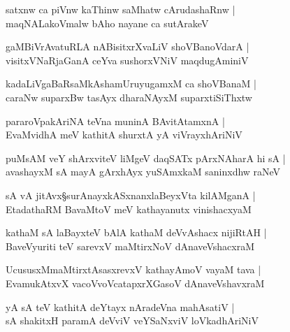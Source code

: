 \begin{shloka}
satxnw ca piVnw kaThinw saMhatw cArudashaRnw |\\
maqNALakoVmalw bAho nayane ca sutArakeV 
\end{shloka}

\begin{shloka}
gaMBiVrAvatuRLA nABisitxrXvaLiV shoVBanoVdarA |\\
visitxVNaRjaGanA ceYva sushorxVNiV maqdugAminiV 
\end{shloka}

\begin{shloka}
kadaLiVgaBaRsaMkAshamUruyugamxM ca shoVBanaM |\\
caraNw suparxBw tasAyx dharaNAyxM suparxtiSiThxtw
\end{shloka}

\begin{shloka}
pararoVpakAriNA teVna muninA BAvitAtamxnA |\\
EvaMvidhA meV kathitA shurxtA yA viVrayxhAriNiV 
\end{shloka}

\begin{shloka}
puMsAM veY shArxviteV liMgeV daqSATx pArxNAharA hi sA |\\
avashayxM sA mayA gArxhAyx yuSAmxkaM saninxdhw raNeV 
\end{shloka}

\begin{shloka}
sA vA jitAvx\S surAnayxkASxnanxlaBeyxVta kilAMganA |\\
EtadathaRM BavaMtoV meV kathayanutx vinishacxyaM 
\end{shloka}

\begin{shloka}
kathaM sA laBayxteV bAlA kathaM deVvAshacx nijiRtAH |\\
BaveVyuriti teV sarevxV maMtirxNoV dAnaveVshacxraM 
\end{shloka}

\begin{shloka}
UcususxMmaMtirxtAsasxrevxV kathayAmoV vayaM tava |\\
EvamukAtxvX vacoVvoVcatapxrXGasoV dAnaveVshavxraM 
\end{shloka}

\begin{shloka}
yA sA teV kathitA deYtayx nAradeVna mahAsatiV |\\
sA shakitxH paramA deVviV veYSaNxviV loVkadhAriNiV
\end{shloka}


